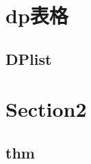 \section{dp表格}
    \subsection{DPlist}
        
    
    



\section{Section2}
    \subsection{thm}
        
